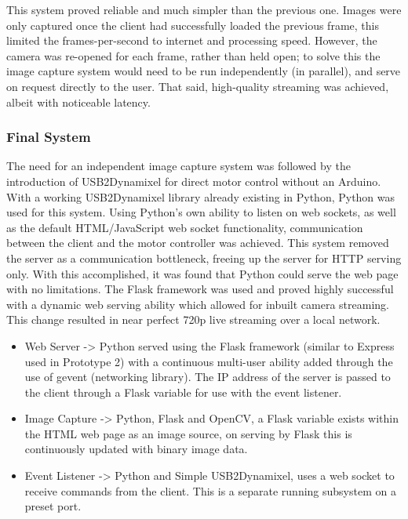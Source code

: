 \documentclass[11pt]{article} %
\begin{document}
This system proved reliable and much simpler than the previous one. Images were only captured once the client had successfully loaded the previous frame, this limited the frames-per-second to internet and processing speed. However, the camera was re-opened for each frame, rather than held open; to solve this the image capture system would need to be run independently (in parallel), and serve on request directly to the user. That said, high-quality streaming was achieved, albeit with noticeable latency.

\subsubsection{Final System}
The need for an independent image capture system was followed by the introduction of USB2Dynamixel for direct motor control without an Arduino. With a working USB2Dynamixel library already existing in Python, Python was used for this system. Using Python’s own ability to listen on web sockets, as well as the default HTML/JavaScript web socket functionality, communication between the client and the motor controller was achieved. This system removed the server as a communication bottleneck, freeing up the server for HTTP serving only. With this accomplished, it was found that Python could serve the web page with no limitations. The Flask framework was used and proved highly successful with a dynamic web serving ability which allowed for inbuilt camera streaming. This change resulted in near perfect 720p live streaming over a local network.

\begin{itemize}
\item Web Server -> Python served using the Flask framework (similar to Express used in Prototype 2) with a continuous multi-user ability added through the use of gevent (networking library). The IP address of the server is passed to the client through a Flask variable for use with the event listener.
\item Image Capture -> Python, Flask and OpenCV, a Flask variable exists within the HTML web page as an image source, on serving by Flask this is continuously updated with binary image data.
\item Event Listener -> Python and Simple USB2Dynamixel, uses a web socket to receive commands from the client. This is a separate running subsystem on a preset port.
\end{itemize}
\end{document}
